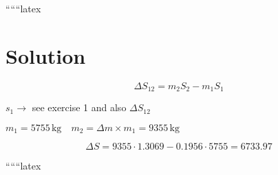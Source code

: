 ``````latex


\section*{Solution}

\begin{equation}
\Delta S_{12} = m_2 S_2 - m_1 S_1
\end{equation}

\noindent
$s_1 \rightarrow$ see exercise 1 and also $\Delta S_{12}$

\noindent
$m_1 = 5755 \, \text{kg} \quad m_2 = \Delta m \times m_1 = 9355 \, \text{kg}$

\begin{equation}
\Delta S = 9355 \cdot 1.3069 - 0.1956 \cdot 5755 = 6733.97
\end{equation}

``````latex


